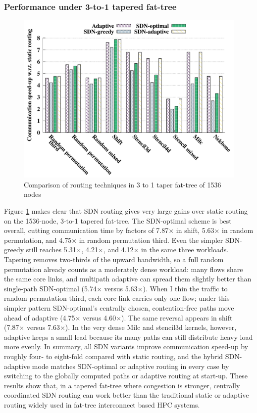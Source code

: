 \subsubsection{Performance under 3-to-1 tapered fat-tree}
\begin{figure}[h]
  \centering
  \includegraphics[width=\columnwidth]{./figs_4/routing_taper.pdf}
  \caption{Comparison of routing techniques in 3 to 1 taper fat-tree of 1536 nodes}
  \label{fig:routing_taper}
\end{figure}
Figure \ref{fig:routing_taper} makes clear that SDN routing gives very large gains over static routing on the 1536-node, 3-to-1 tapered fat-tree. The SDN-optimal scheme is best overall, cutting communication time by factors of 7.87× in shift, 5.63× in random permutation, and 4.75× in random permutation third. Even the simpler SDN-greedy still reaches 5.31×, 4.21×, and 4.12× in the same three workloads. 
Tapering removes two-thirds of the upward bandwidth, so a full random permutation already counts as a moderately dense workload: many flows share the same core links, and multipath adaptive can spread them slightly better than single-path SDN-optimal (5.74× versus 5.63×). When I thin the traffic to random-permutation-third, each core link carries only one flow; under this simpler pattern SDN-optimal’s centrally chosen, contention-free paths move ahead of adaptive (4.75× versus 4.60×). The same reversal appears in shift (7.87× versus 7.63×). In the very dense Milc and stencil3d kernels, however, adaptive keeps a small lead because its many paths can still distribute heavy load more evenly.
In summary, all SDN variants improve communication speed-up by roughly four- to eight-fold compared with static routing, and the hybrid SDN-adaptive mode matches SDN-optimal or adaptive routing in every case by switching to the globally computed paths or adaptive routing at start-up. These results show that, in a tapered fat-tree where congestion is stronger, centrally coordinated SDN routing can work better than the traditional static or adaptive routing widely used in fat-tree interconnect based HPC systems.
